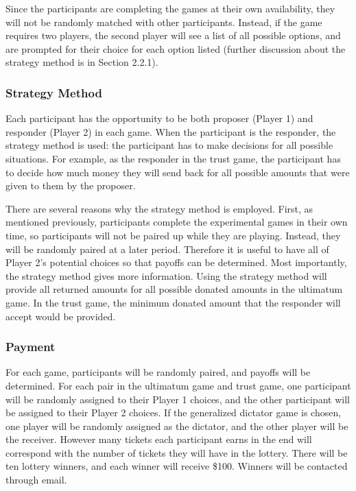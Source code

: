\documentclass[12pt]{article}
\begin{document}
Since the participants are completing the games at their own availability, they will not be randomly matched with other participants. Instead, if the game requires two players, the second player will see a list of all possible options, and are prompted for their choice for each option listed (further discussion about the strategy method is in Section 2.2.1). 


\subsubsection{Strategy Method}

Each participant has the opportunity to be both proposer (Player 1) and responder (Player 2) in each game. When the participant is the responder, the strategy method is used: the participant has to make decisions for all possible situations. For example, as the responder in the trust game, the participant has to decide how much money they will send back for all possible amounts that were given to them by the proposer. 

There are several reasons why the strategy method is employed. First, as mentioned previously, participants complete the experimental games in their own time, so participants will not be paired up while they are playing. Instead, they will be randomly paired at a later period. Therefore it is useful to have all of Player 2\rq s potential choices so that payoffs can be determined. Most importantly, the strategy method gives more information. Using the strategy method will provide all returned amounts for all possible donated amounts in the ultimatum game. In the trust game, the minimum donated amount that the responder will accept would be provided. 

\subsubsection{Payment}

For each game, participants will be randomly paired, and payoffs will be determined. For each pair in the ultimatum game and trust game, one participant will be randomly assigned to their Player 1 choices, and the other participant will be assigned to their Player 2 choices. If the generalized dictator game is chosen, one player will be randomly assigned as the dictator, and the other player will be the receiver. However many tickets each participant earns in the end will correspond with the number of tickets they will have in the lottery. There will be ten lottery winners, and each winner will receive \$100. Winners will be contacted through email. 
\end{document}

